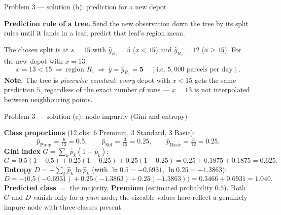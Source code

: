 \documentclass[aspectratio=169,11pt]{beamer}
\begin{document}
\begin{frame}{Problem 3 --- solution (b): prediction for a new depot}
  \begin{solutionbox}
    \textbf{Prediction rule of a tree.} Send the new observation down the tree by its split rules
    until it lands in a leaf; predict that leaf's region mean.
    \medskip

    The chosen split is at $s=15$ with $\hat y_{R_1}=5$ ($x<15$) and $\hat y_{R_2}=12$ ($x\ge 15$).
    For the new depot with $x=13$:
    \[
      x=13<15\ \Rightarrow\ \text{region }R_1\ \Rightarrow\ \hat y=\hat y_{R_1}=\mathbf{5}
      \quad(\text{i.e.\ }5{,}000\text{ parcels per day}).
    \]
    \textbf{Note.} The tree is \emph{piecewise constant}: \emph{every} depot with $x<15$ gets the
    same prediction $5$, regardless of the exact number of vans --- $x=13$ is not interpolated
    between neighbouring points.
  \end{solutionbox}
\end{frame}

\begin{frame}{Problem 3 --- solution (c): node impurity (Gini and entropy)}
  \begin{solutionbox}
    \textbf{Class proportions} (12 obs: 6 Premium, 3 Standard, 3 Basic):
    \[
      \hat p_{\text{Prem}}=\tfrac{6}{12}=0.5,\qquad
      \hat p_{\text{Std}}=\tfrac{3}{12}=0.25,\qquad
      \hat p_{\text{Basic}}=\tfrac{3}{12}=0.25.
    \]
    \textbf{Gini index} $G=\sum_k\hat p_k(1-\hat p_k)$:
    \[
      G=0.5(1-0.5)+0.25(1-0.25)+0.25(1-0.25)=0.25+0.1875+0.1875=\mathbf{0.625}.
    \]
    \textbf{Entropy} $D=-\sum_k\hat p_k\ln\hat p_k$ (with $\ln 0.5=-0.6931$, $\ln 0.25=-1.3863$):
    \[
      D=-\bigl(0.5(-0.6931)+0.25(-1.3863)+0.25(-1.3863)\bigr)=0.3466+0.6931=\mathbf{1.040}.
    \]
    \textbf{Predicted class} $=$ the majority, \textbf{Premium} (estimated probability $0.5$). Both
    $G$ and $D$ vanish only for a \emph{pure} node; the sizeable values here reflect a genuinely
    impure node with three classes present.
  \end{solutionbox}
\end{frame}
\end{document}
